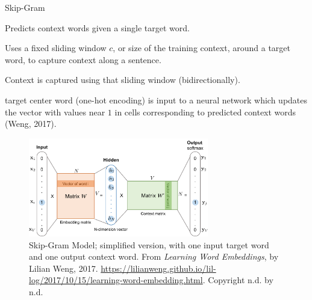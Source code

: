 \begin{frame}{Skip-Gram}\label{SkipGram}
    
    \begin{itemizeSpaced}{5pt}
        \item  Predicts context words given a single target word. 
        
        \item Uses a fixed sliding window $c$, or size of the training context, around a target word, to capture context along a sentence. 
        
        \item Context is captured using that sliding window (bidirectionally). 
        
        \item target center word (one-hot encoding) is input to a neural network which updates the vector with values near $1$ in cells corresponding to predicted context words (Weng, 2017).  
        
    \end{itemizeSpaced}
    
    
    \begin{figure}[h]
    \vspace{-5pt}
    \centering
    \includegraphics[width=0.7\textwidth]{imgs/skipgram_image.png}
    \vspace{-5pt}
    \caption{\tiny Skip-Gram Model; simplified version, with one input target word and one output context word. From \emph{Learning Word Embeddings}, by Lilian Weng, 2017. \url{https://lilianweng.github.io/lil-log/2017/10/15/learning-word-embedding.html}. Copyright n.d. by n.d.}
    \label{fig:SkipGram}
    \vspace{-5pt}
    \end{figure}
    
\end{frame}


